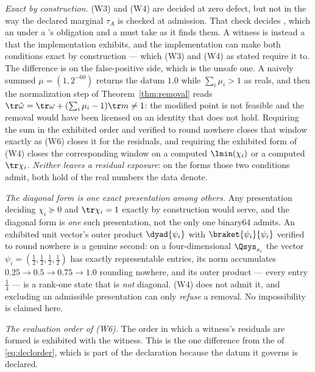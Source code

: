 \begin{remark}\label{rem:witness-exactness}
\emph{Exact by construction.} (W3) and (W4) are decided at zero defect,
but not in the way the declared marginal $\tau_A$ is checked at admission.
That check decides , which an 
 under a 's obligation and a
 must take as it finds them. A witness is instead a
 that the implementation exhibits, and the
implementation can make both conditions exact by construction --- which
(W3) and (W4) as stated require it to. The difference is on the false-positive side, which is the
unsafe one. A naively summed $\mu=(1,2^{-60})$ returns the datum $1.0$
while $\sum_i\mu_i>1$ as reals, and then the normalization step of
Theorem~\ref{thm:removal} reads
$\tr\hat\omega=\tr\omega+(\sum_i\mu_i-1)\tr m\ne1$: the modified point is
not feasible and the removal would have been licensed on an identity that
does not hold. Requiring the sum in the exhibited order and verified to
round nowhere closes that window exactly as (W6) closes it for the
residuals, and requiring the exhibited form of (W4) closes the
corresponding window on a computed $\lmin(\chi_i)$ or a computed
$\tr\chi_i$. \emph{Neither leaves a residual exposure}: on the forms those
two conditions admit, both hold of the real numbers the data denote.

\emph{The diagonal form is one exact presentation among others.} Any
presentation deciding $\chi_i\succeq0$ and $\tr\chi_i=1$ exactly by
construction would serve, and the diagonal form is \emph{one} such
presentation, not the only one binary64 admits. An exhibited unit vector's
outer product $\dyad{\psi_i}$ with $\braket{\psi_i}{\psi_i}$ verified to
round nowhere is a genuine second: on a four-dimensional $\Qsys_{s_i}$ the
vector $\psi_i=(\tfrac12,\tfrac12,\tfrac12,\tfrac12)$ has exactly
representable entries, its norm accumulates $0.25\to0.5\to0.75\to1.0$
rounding nowhere, and its outer product --- every entry $\tfrac14$ --- is a
rank-one state that is \emph{not} diagonal. (W4) does not admit it, and
excluding an admissible presentation can only \emph{refuse} a removal. No
impossibility is claimed here.

\emph{The evaluation order of (W6).} The order in which a witness's
residuals are formed is exhibited with the witness. This is the one
difference from the  of \eqref{eq:declorder}, which is
part of the declaration because the datum it governs is declared.
\end{remark}
